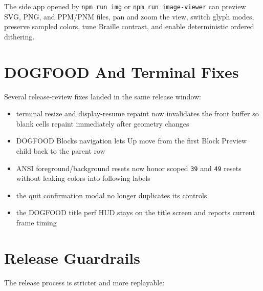 The side app opened by \texttt{n\allowbreak{}p\allowbreak{}m\allowbreak{} \allowbreak{}r\allowbreak{}u\allowbreak{}n\allowbreak{} \allowbreak{}i\allowbreak{}m\allowbreak{}g} or \texttt{n\allowbreak{}p\allowbreak{}m\allowbreak{} \allowbreak{}r\allowbreak{}u\allowbreak{}n\allowbreak{} \allowbreak{}i\allowbreak{}m\allowbreak{}a\allowbreak{}g\allowbreak{}e\allowbreak{}-\allowbreak{}v\allowbreak{}i\allowbreak{}e\allowbreak{}w\allowbreak{}e\allowbreak{}r} can preview SVG, PNG, and PPM/PNM files, pan and zoom the view, switch glyph modes, preserve sampled colors, tune Braille contrast, and enable deterministic ordered dithering.

\section{DOGFOOD And Terminal Fixes}\label{record-282-dogfood-and-terminal-fixes}

Several release-review fixes landed in the same release window:

\begin{itemize}
\tightlist
\item
  terminal resize and display-resume repaint now invalidates the front buffer so blank cells repaint immediately after geometry changes
\item
  DOGFOOD Blocks navigation lets Up move from the first Block Preview child back to the parent row
\item
  ANSI foreground/background resets now honor scoped \texttt{3\allowbreak{}9} and \texttt{4\allowbreak{}9} resets without leaking colors into following labels
\item
  the quit confirmation modal no longer duplicates its controls
\item
  the DOGFOOD title perf HUD stays on the title screen and reports current frame timing
\end{itemize}

\section{Release Guardrails}\label{record-282-release-guardrails}

The release process is stricter and more replayable:

